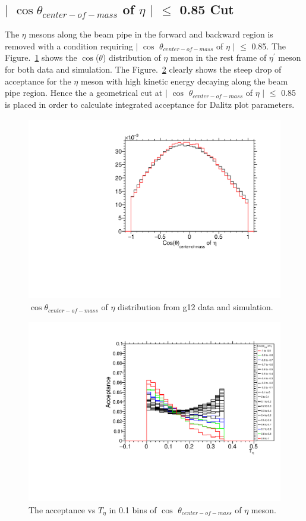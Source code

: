 \subsection{$\mid$ $\cos\theta_{center-of-mass}$ of $\eta$ $\mid$ $\leq$ 0.85 Cut}
\label{CosEta}

  The $\eta$ mesons along the beam pipe in the forward and backward region is removed with a condition requiring $\mid$ $\cos$ $\theta_{center-of-mass}$ of $\eta$ $\mid$ $\leq$ 0.85.  The Figure.~\ref{Fig_CsE_1} shows the $\cos$($\theta$) distribution of $\eta$ meson in the rest frame of $\eta^{\prime}$ meson for both data and simulation. The Figure.~\ref{Fig_CsE_2} clearly shows the steep drop of acceptance for the $\eta$ meson with high kinetic energy decaying along the beam pipe region. Hence the a geometrical cut at $\mid$ $\cos$ $\theta_{center-of-mass}$ of $\eta$ $\mid$ $\leq$ 0.85 is placed in order to calculate integrated acceptance for Dalitz plot parameters. 
  
 \begin{figure}[ht!]
\centerline{
\includegraphics[width=12cm,height=8cm]{cs.pdf}}
\caption{$\cos\theta_{center-of-mass}$ of $\eta$ distribution from g12 data and simulation. }
\label{Fig_CsE_1}
\end{figure}


\begin{figure}[ht!]
\centerline{
\includegraphics[width=12cm,height=8cm]{Acc_T.pdf}}
\caption{The acceptance vs $T_{\eta}$ in 0.1 bins of $\cos$ 
$\theta_{center-of-mass}$ of $\eta$ meson. }
\label{Fig_CsE_2}
\end{figure}

